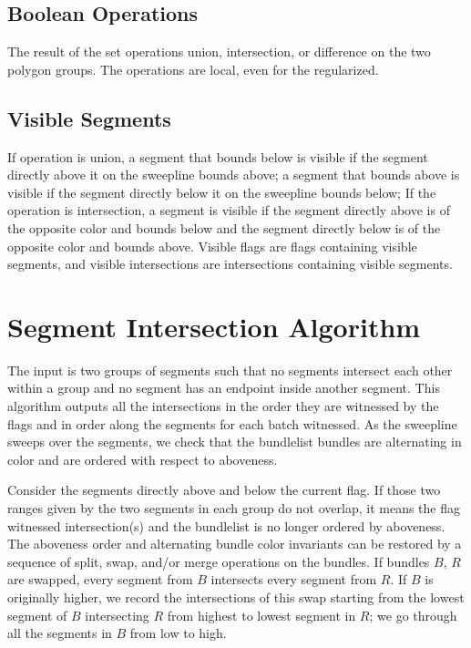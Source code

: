 \documentclass[11pt]{article}
\begin{document}
\subsection{Boolean Operations}
The result of the set operations union, intersection, or difference on the two polygon groups.
The operations are local, even for the regularized. 

\subsection{Visible Segments}
If operation is union, a segment that bounds below is visible if the segment directly above it on the sweepline bounds above; a segment that bounds above is visible if the segment directly below it on the sweepline bounds below;
If the operation is intersection, a segment is visible if the segment directly above is of the opposite color and bounds below and the segment directly below is of the opposite color and bounds above.
Visible flags are flags containing visible segments, and visible intersections are intersections containing visible segments.

\section{Segment Intersection Algorithm} \label{sec inter}
The input is two groups of segments such that no segments intersect each other within a group and no segment has an endpoint inside another segment.
This algorithm outputs all the intersections in the order they are witnessed by the flags and in order along the segments for each batch witnessed.
As the sweepline sweeps over the segments, we check that the bundlelist bundles are alternating in color and are ordered with respect to aboveness.

Consider the segments directly above and below the current flag. 
If those two ranges given by the two segments in each group do not overlap, it means the flag witnessed intersection(s) and the bundlelist is no longer ordered by aboveness.
The aboveness order and alternating bundle color invariants can be restored by a sequence of split, swap, and/or merge operations on the bundles.
If bundles $B$, $R$ are swapped, every segment from $B$ intersects every segment from $R$.
If $B$ is originally higher, we record the intersections of this swap starting from the lowest segment of $B$ intersecting $R$ from highest to lowest segment in $R$; we go through all the segments in $B$ from low to high.
\end{document}
